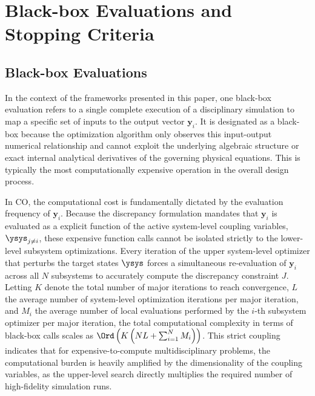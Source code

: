 \section{Black-box Evaluations and Stopping Criteria}\label{sec:conv}

\subsection{Black-box Evaluations}\label{subsec:eval}

In the context of the frameworks presented in this paper, one black-box evaluation refers to a single complete execution of a disciplinary simulation to map a specific set of inputs to the output vector \(\bm{y}_i\). It is designated as a black-box because the optimization algorithm only observes this input-output numerical relationship and cannot exploit the underlying algebraic structure or exact internal analytical derivatives of the governing physical equations. This is typically the most computationally expensive operation in the overall design process.

In CO, the computational cost is fundamentally dictated by the evaluation frequency of \(\bm{y}_i\). Because the discrepancy formulation mandates that \(\bm{y}_i\) is evaluated as a explicit function of the active system-level coupling variables, \(\ysys_{j\neq i}\), these expensive function calls cannot be isolated strictly to the lower-level subsystem optimizations. Every iteration of the upper system-level optimizer that perturbs the target states \(\ysys\) forces a simultaneous re-evaluation of \(\bm{y}_i\) across all \(N\) subsystems to accurately compute the discrepancy constraint \(J\). Letting \(K\) denote the total number of major iterations to reach convergence, \(L\) the average number of system-level optimization iterations per major iteration, and \(M_i\) the average number of local evaluations performed by the \(i\)-th subsystem optimizer per major iteration, the total computational complexity in terms of black-box calls scales as \(\Ord\left(K \left( N L + \sum_{i=1}^{N} M_i \right)\right)\). This strict coupling indicates that for expensive-to-compute multidisciplinary problems, the computational burden is heavily amplified by the dimensionality of the coupling variables, as the upper-level search directly multiplies the required number of high-fidelity simulation runs.

